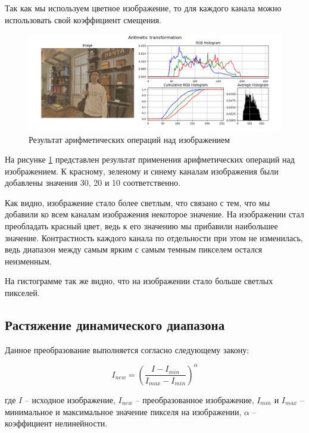 Так как мы используем цветное изображение, то для каждого канала можно использовать свой коэффициент смещения.

\begin{figure}[H]
    \centering
    \includegraphics[width=\textwidth]{../results/Aritmetic transformation.png}
    \caption{Результат арифметических операций над изображением}
    \label{fig:aritmetic}
\end{figure}

На рисунке \ref{fig:aritmetic} представлен результат применения арифметических операций над изображением. К красному, зеленому и синему каналам изображения были добавлены значения 30, 20 и 10 соответственно.

Как видно, изображение стало более светлым, что связано с тем, что мы добавили ко всем каналам изображения некоторое значение. На изображении стал преобладать красный цвет, ведь к его значению мы прибавили наибольшее значение. 
Контрастность каждого канала по отдельности при этом не изменилась, ведь диапазон между самым ярким с самым темным пикселем остался неизменным. 

На гистограмме так же видно, что на изображении стало больше светлых пикселей. 

\subsection{Растяжение динамического диапазона}

Данное преобразование выполняется согласно следующему закону: 

\begin{equation}
  I_{new} = \left( \frac{I - I_{min}}{I_{max} - I_{min}} \right)^\alpha
\end{equation}

где $I$ -- исходное изображение, $I_{new}$ -- преобразованное изображение, $I_{min}$ и $I_{max}$ -- минимальное и максимальное значение пикселя на изображении, $\alpha$ -- коэффициент нелинейности.

